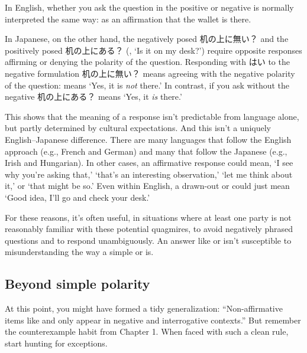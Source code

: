 In English, whether you ask the question in the positive  or negative   is normally interpreted the same way: as an affirmation that the wallet is there. 

In Japanese, on the other hand, the negatively posed 机の上に無い？ and the positively posed 机の上にある？ (, `Is it on my desk?') require opposite responses affirming or denying the polarity of the question. Responding with はい to the negative formulation 机の上に無い？ means agreeing with the negative polarity of the question:  means `Yes, it is \emph{not} there.' In contrast, if you ask without the negative 机の上にある？  means `Yes, it \emph{is} there.'

This shows that the meaning of a response isn't predictable from language alone, but partly determined by cultural expectations. And this isn't a uniquely English--Japanese difference. There are many languages that follow the English approach (e.g., French and German) and many that follow the Japanese (e.g., Irish and Hungarian).
In other cases, an affirmative response could mean, `I see why you're asking that,' `that's an interesting observation,' `let me think about it,' or `that might be so.' Even within English, a drawn-out  or  could just mean `Good idea, I'll go and check your desk.'

For these reasons, it's often useful, in situations where at least one party is not reasonably familiar with these potential quagmires, to avoid negatively phrased questions and to respond unambiguously. An answer like  or  isn't susceptible to misunderstanding the way a simple  or  is.

\subsection{Beyond simple polarity}

At this point, you might have formed a tidy generalization: \enquote{Non-affirmative items like  and  only appear in negative and interrogative contexts.} But remember the counterexample habit from Chapter 1. When faced with such a clean rule, start hunting for exceptions.

